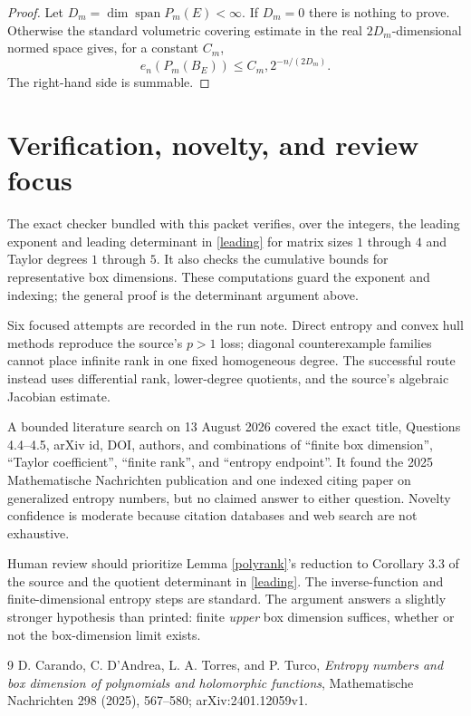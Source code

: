 \documentclass[11pt]{article}
\newcommand{\Span}{\operatorname{span}}
\begin{document}
\begin{proof}
Let $D_m=\dim\Span P_m(E)<\infty$.  If $D_m=0$ there is nothing to prove.
Otherwise the standard volumetric covering estimate in the real
$2D_m$-dimensional normed space gives, for a constant $C_m$,
\[
 e_n(P_m(B_E))\le C_m,2^{-n/(2D_m)}.
\]
The right-hand side is summable.
\end{proof}

\section{Verification, novelty, and review focus}

The exact checker bundled with this packet verifies, over the integers, the
leading exponent and leading determinant in \eqref{leading} for matrix sizes
$1$ through $4$ and Taylor degrees $1$ through $5$.  It also checks the
cumulative bounds for representative box dimensions.  These computations
guard the exponent and indexing; the general proof is the determinant
argument above.

Six focused attempts are recorded in the run note.  Direct entropy and convex
hull methods reproduce the source's $p>1$ loss; diagonal counterexample
families cannot place infinite rank in one fixed homogeneous degree.  The
successful route instead uses differential rank, lower-degree quotients, and
the source's algebraic Jacobian estimate.

A bounded literature search on 13 August 2026 covered the exact title,
Questions 4.4--4.5, arXiv id, DOI, authors, and combinations of ``finite box
dimension'', ``Taylor coefficient'', ``finite rank'', and ``entropy
endpoint''.  It found the 2025 Mathematische Nachrichten publication and one
indexed citing paper on generalized entropy numbers, but no claimed answer to
either question.  Novelty confidence is moderate because citation databases
and web search are not exhaustive.

Human review should prioritize Lemma \ref{polyrank}'s reduction to Corollary
3.3 of the source and the quotient determinant in \eqref{leading}.  The
inverse-function and finite-dimensional entropy steps are standard.  The
argument answers a slightly stronger hypothesis than printed: finite
\emph{upper} box dimension suffices, whether or not the box-dimension limit
exists.

\begin{thebibliography}{9}
D. Carando, C. D'Andrea, L. A. Torres, and P. Turco,
\emph{Entropy numbers and box dimension of polynomials and holomorphic
functions}, Mathematische Nachrichten 298 (2025), 567--580;
arXiv:2401.12059v1.
\end{thebibliography}
\end{document}
